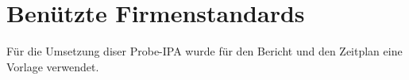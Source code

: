 \chapter{Benützte Firmenstandards}\label{ch:benuetzte-firmenstandards}

Für die Umsetzung diser Probe-IPA wurde für den Bericht und den Zeitplan eine Vorlage verwendet.
